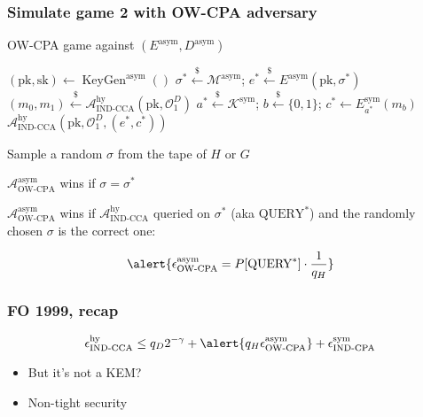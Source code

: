 \documentclass{beamer}
\newcommand{\leftsample}{\overset{{\scriptscriptstyle\$}}{\leftarrow}}
\begin{document}
\begin{frame}
    \frametitle{Simulate game 2 with OW-CPA adversary}

    \begin{algorithm}[H]
        \SetAlgoLined
        \caption{OW-CPA game against $(E^\text{asym}, D^\text{asym})$}
        $(\text{pk}, \text{sk}) \leftarrow \operatorname{KeyGen}^\text{asym}()$\;
        $\sigma^\ast \leftsample \mathcal{M}^\text{asym}$; 
        $e^\ast \leftsample E^\text{asym}(\text{pk}, \sigma^\ast)$
        \;
        $(m_0, m_1) \leftsample \mathcal{A}^\text{hy}_\text{IND-CCA}(
            \text{pk}, \mathcal{O}^D_1
        )$\;
        $a^\ast \leftsample \mathcal{K}^\text{sym}$;
        $b\leftsample \{0, 1\}$;
        $c^\ast \leftarrow E^\text{sym}_{a^\ast}(m_b)$\;
        $\mathcal{A}^\text{hy}_\text{IND-CCA}(
            \text{pk}, \mathcal{O}^D_1, (e^\ast, c^\ast)
        )$
        \;
        
        \alert{Sample a random $\sigma$ from the tape of $H$ or $G$}\;

        $\mathcal{A}^\text{asym}_\text{OW-CPA}$ wins if $\sigma = \sigma^\ast$
    \end{algorithm}

    $\mathcal{A}^\text{asym}_\text{OW-CPA}$ wins if $\mathcal{A}^\text{hy}_\text{IND-CCA}$ queried on $\sigma^\ast$ (aka $\text{QUERY}^\ast$) and the randomly chosen $\sigma$ is the correct one:

    \begin{equation*}
        \alert{
            \epsilon^\text{asym}_\text{OW-CPA} 
            = P[\text{QUERY}^\ast] \cdot \frac{1}{q_H}
        }
    \end{equation*}
\end{frame}

\begin{frame}
    \frametitle{FO 1999, recap}

    \begin{equation*}
        \epsilon^\text{hy}_\text{IND-CCA} 
        \leq q_D2^{-\gamma} 
        + \alert{q_H\epsilon^\text{asym}_\text{OW-CPA} }
        + \epsilon^\text{sym}_\text{IND-CPA} 
    \end{equation*}

    \begin{itemize}
        \item But it's not a KEM?
        \item \alert{Non-tight security}
    \end{itemize}

\end{frame}
\end{document}
